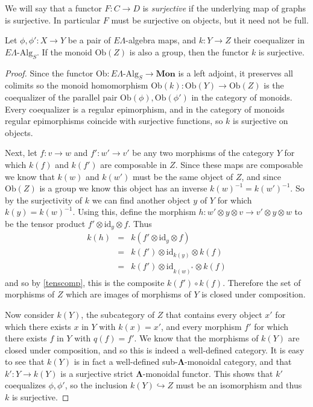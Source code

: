 \documentclass{amsbook} %
\newcommand{\mb}{\mathbf}
\newcommand{\ML}{\mathbf{\Lambda}}
\newcommand{\mon}{\ensuremath{\mb{Mon}}}
\numberwithin{section}{chapter}
\begin{document}
\begin{Defi}
We will say that a functor $F: C \to D$ is \emph{surjective} if the underlying map of graphs is surjective. In particular $F$ must be surjective on objects, but it need not be full.
\end{Defi}

\begin{prop}\label{coeqsurj} Let $\phi, \phi' : X \to Y$ be a pair of $E\Lambda$-algebra maps, and $k: Y \to Z$ their coequalizer in $E\Lambda\mbox{-}\mathrm{Alg}_S$. If the monoid $\mathrm{Ob}(Z)$ is also a group, then the functor $k$ is surjective.
\end{prop}
\begin{proof}
Since the functor $\mathrm{Ob} : E\Lambda\mbox{-}\mathrm{Alg}_S \to \mon$ is a left adjoint, it preserves all colimits so the monoid homomorphism $\mathrm{Ob}(k): \mathrm{Ob}(Y) \to \mathrm{Ob}(Z)$ is the coequalizer of the parallel pair $\mathrm{Ob}(\phi), \mathrm{Ob}(\phi')$ in the category of monoids. Every coequalizer is a regular epimorphism, and in the category of monoids regular epimorphisms coincide with  surjective functions, so $k$ is surjective on objects.


Next, let $f: v \to w$ and $f' : w' \to v'$ be any two morphisms of the category $Y$ for which $k(f)$ and $k(f')$ are composable in $Z$. Since these maps are composable we know that $k(w)$ and $k(w')$ must be the same object of $Z$, and since $\mathrm{Ob}(Z)$ is a group we know this object has an inverse $k(w)^{-1} = k(w')^{-1}$. So by the surjectivity of $k$ we can find another object $y$ of $Y$ for which $k(y) = k(w)^{-1}$. Using this, define the morphism $h: w' \otimes y \otimes v \to v' \otimes y \otimes w$ to be the tensor product $f' \otimes \mathrm{id}_y \otimes f$. Thus
\[ \begin{array}{rll}
		k(h) & = & k(f' \otimes \mathrm{id}_y \otimes f) \\
		& = & k(f') \otimes \mathrm{id}_{k(y)} \otimes k(f) \\
		& = & k(f') \otimes \mathrm{id}_{k(w)^*} \otimes k(f)
		\end{array}
\]
and so by \cref{tenscomp}, this is the composite $k(f') \circ k(f)$. Therefore the set of morphisms of $Z$ which are images of morphisms of $Y$ is closed under composition. 

Now consider $k(Y)$, the subcategory of $Z$ that contains every object $x'$ for which there exists $x$ in $Y$ with $k(x) = x'$, and every morphism $f'$ for which there exists $f$ in $Y$ with $q(f) = f'$. We know that the morphisms of $k(Y)$ are closed under composition, and so this is indeed a well-defined category. It is easy to see that $k(Y)$ is in fact a well-defined sub-$\ML$-monoidal category, and that $k': Y \to k(Y)$ is a surjective strict $\ML$-monoidal functor. This shows that $k'$ coequalizes $\phi, \phi'$, so the inclusion $k(Y) \hookrightarrow Z$ must be an isomorphism and thus $k$ is surjective.
\end{proof}
\end{document}
